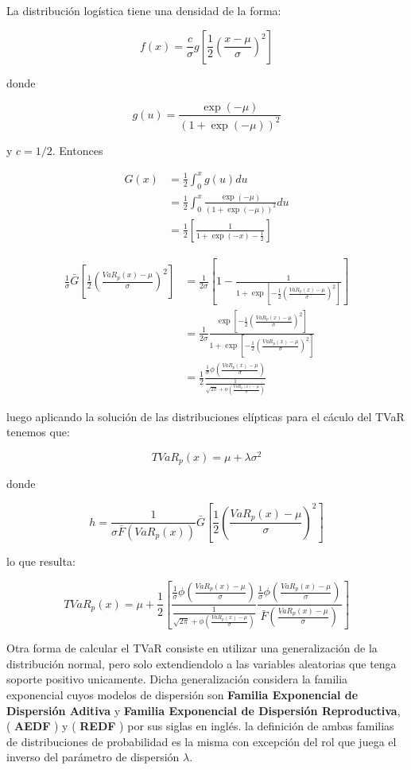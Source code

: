 \documentclass[10pt,]{article}
\begin{document}
La distribución logística tiene una densidad de la forma:

\[f(x)=\frac{c}{\sigma}g\left[\frac{1}{2}\left(\frac{x-\mu}{\sigma}\right)^2\right]\]

donde

\[g(u)= \frac{\exp(-\mu)}{(1+ \exp(-\mu))^2}\]

y \(c=1/2\). Entonces

\[\begin{array}{rl}
G(x) &\displaystyle=\frac{1}{2}\int_{0}^{x}g(u)du\\
&\displaystyle=\frac{1}{2}\int_{0}^{x}\frac{\exp(-\mu)}{(1+ \exp(-\mu))^2}du\\
&\displaystyle=\frac{1}{2}\left[\frac{1}{1+\exp(-x)-\frac{1}{2}}\right]
\end{array}\]

\[\begin{array}{rl}
\frac{1}{\sigma} \bar{G}\left[\frac{1}{2}\left(\frac{VaR_p(x)-\mu}{\sigma}\right)^2\right] &\displaystyle= \frac{1}{2 \sigma} \left[1-\frac{1}{1+ \exp\left[-\frac{1}{2}\left(\frac{VaR_p(x)-\mu}{\sigma}\right)^2\right]}\right]\\
&\displaystyle
= \frac{1}{2 \sigma}\frac{\exp\left[-\frac{1}{2} \left(\frac{VaR_p(x)-\mu}{\sigma}\right)^2\right]}{1+ \exp \left[-\frac{1}{2} \left(\frac{VaR_p(x)-\mu}{\sigma}\right)^2\right]}\\
&\displaystyle= \frac{1}{2} \frac{ \frac{1}{\sigma}\phi\left(\frac{VaR_p(x)-\mu}{\sigma}\right)}{\frac{1}{\sqrt{2\pi}+\phi\left(\frac{VaR_p(x)-\mu}{\sigma}\right)}}
\end{array}\]

luego aplicando la solución de las distribuciones elípticas para el
cáculo del TVaR tenemos que:

\[TVaR_p(x)= \mu + \lambda \sigma^2\]

donde

\[h=\frac{1}{\sigma \bar{F}(VaR_p(x))}\bar{G} \left[\frac{1}{2} \left(\frac{VaR_p(x)-\mu}{\sigma}\right)^2\right]\]

lo que resulta:

\[TVaR_p(x)= \mu + \frac{1}{2} \left[\frac{ \frac{1}{\sigma}\phi\left(\frac{VaR_p(x)-\mu}{\sigma}\right)}{\frac{1}{\sqrt{2\pi}+\phi\left(\frac{VaR_p(x)-\mu}{\sigma}\right)}}\frac{ \frac{1}{\sigma}\phi\left(\frac{VaR_p(x)-\mu}{\sigma}\right)}{\bar{F}(\frac{VaR_p(x)-\mu}{\sigma})} \right]\]

Otra forma de calcular el TVaR consiste en utilizar una generalización
de la distribución normal, pero solo extendiendolo a las variables
aleatorias que tenga soporte positivo unicamente. Dicha generalización
considera la familia exponencial cuyos modelos de dispersión son
\textbf{Familia Exponencial de Dispersión Aditiva} y \textbf{Familia
Exponencial de Dispersión Reproductiva}, ( \textbf{AEDF} ) y (
\textbf{REDF} ) por sus siglas en inglés. la definición de ambas
familias de distribuciones de probabilidad es la misma con excepción del
rol que juega el inverso del parámetro de dispersión \(\lambda\).
\end{document}

